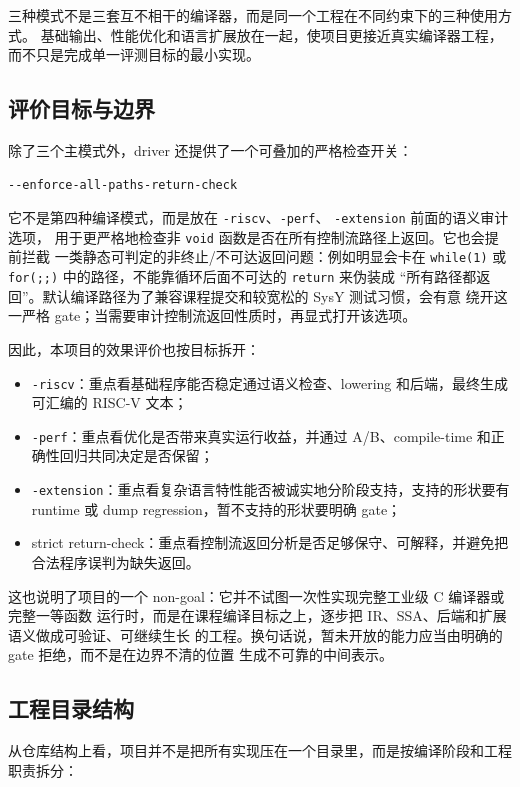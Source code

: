 \documentclass[UTF8,a4paper,11pt]{ctexart}
\begin{document}
三种模式不是三套互不相干的编译器，而是同一个工程在不同约束下的三种使用方式。
基础输出、性能优化和语言扩展放在一起，使项目更接近真实编译器工程，
而不只是完成单一评测目标的最小实现。

\subsection{评价目标与边界}

除了三个主模式外，driver 还提供了一个可叠加的严格检查开关：
\begin{lstlisting}[language={}]
--enforce-all-paths-return-check
\end{lstlisting}
它不是第四种编译模式，而是放在 \texttt{-riscv}、\texttt{-perf}、
\texttt{-extension} 前面的语义审计选项，
用于更严格地检查非 \texttt{void} 函数是否在所有控制流路径上返回。它也会提前拦截
一类静态可判定的非终止/不可达返回问题：例如明显会卡在 \texttt{while(1)} 或
\texttt{for(;;)} 中的路径，不能靠循环后面不可达的 \texttt{return} 来伪装成
“所有路径都返回”。默认编译路径为了兼容课程提交和较宽松的 SysY 测试习惯，会有意
绕开这一严格 gate；当需要审计控制流返回性质时，再显式打开该选项。

因此，本项目的效果评价也按目标拆开：

\begin{itemize}
  \item \texttt{-riscv}：重点看基础程序能否稳定通过语义检查、lowering 和后端，最终生成可汇编的 RISC-V 文本；
  \item \texttt{-perf}：重点看优化是否带来真实运行收益，并通过 A/B、compile-time 和正确性回归共同决定是否保留；
  \item \texttt{-extension}：重点看复杂语言特性能否被诚实地分阶段支持，支持的形状要有 runtime 或 dump regression，暂不支持的形状要明确 gate；
  \item strict return-check：重点看控制流返回分析是否足够保守、可解释，并避免把合法程序误判为缺失返回。
\end{itemize}

这也说明了项目的一个 non-goal：它并不试图一次性实现完整工业级 C 编译器或完整一等函数
运行时，而是在课程编译目标之上，逐步把 IR、SSA、后端和扩展语义做成可验证、可继续生长
的工程。换句话说，暂未开放的能力应当由明确的 gate 拒绝，而不是在边界不清的位置
生成不可靠的中间表示。

\subsection{工程目录结构}

从仓库结构上看，项目并不是把所有实现压在一个目录里，而是按编译阶段和工程职责拆分：
\end{document}
